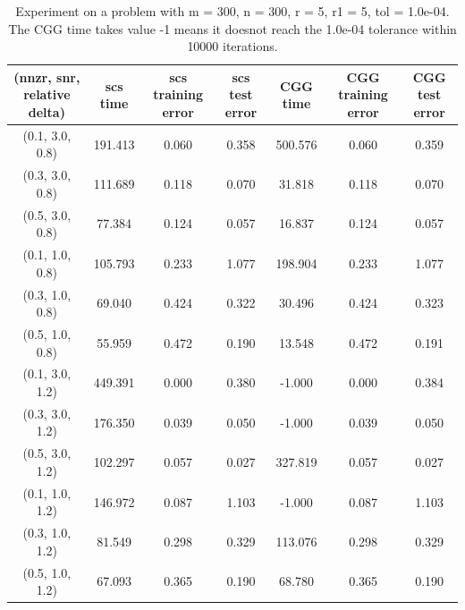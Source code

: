 \documentclass[english]{article}
\begin{document}
%
\begin{table}[H] 
	\centering
	\label{MC-side-information}
	\begin{tabular}{ccccccc}
		\toprule
		(nnzr, snr, relative delta) &scs time &scs training error &scs test error &CGG time &CGG training error &CGG test error\\ 
		\midrule 
		(0.1, 3.0, 0.8)& 191.413  &0.060  &0.358  &500.576  &0.060  &0.359 \\ 
		(0.3, 3.0, 0.8)& 111.689  &0.118  &0.070  &31.818  &0.118  &0.070 \\ 
		(0.5, 3.0, 0.8)& 77.384  &0.124  &0.057  &16.837  &0.124  &0.057 \\ 
		(0.1, 1.0, 0.8)& 105.793  &0.233  &1.077  &198.904  &0.233  &1.077 \\ 
		(0.3, 1.0, 0.8)& 69.040  &0.424  &0.322  &30.496  &0.424  &0.323 \\ 
		(0.5, 1.0, 0.8)& 55.959  &0.472  &0.190  &13.548  &0.472  &0.191 \\ 
		(0.1, 3.0, 1.2)& 449.391  &0.000  &0.380  &-1.000  &0.000  &0.384 \\ 
		(0.3, 3.0, 1.2)& 176.350  &0.039  &0.050  &-1.000  &0.039  &0.050 \\ 
		(0.5, 3.0, 1.2)& 102.297  &0.057  &0.027  &327.819  &0.057  &0.027 \\ 
		(0.1, 1.0, 1.2)& 146.972  &0.087  &1.103  &-1.000  &0.087  &1.103 \\ 
		(0.3, 1.0, 1.2)& 81.549  &0.298  &0.329  &113.076  &0.298  &0.329 \\ 
		(0.5, 1.0, 1.2)& 67.093  &0.365  &0.190  &68.780  &0.365  &0.190 \\ 
		\bottomrule
	\end{tabular}
	\caption{Experiment on a problem with m = 300, n = 300, r = 5, r1 = 5, tol = 1.0e-04. The CGG time takes value -1 means it doesnot reach the 1.0e-04 tolerance within 10000 iterations.}
\end{table}






\end{document}
